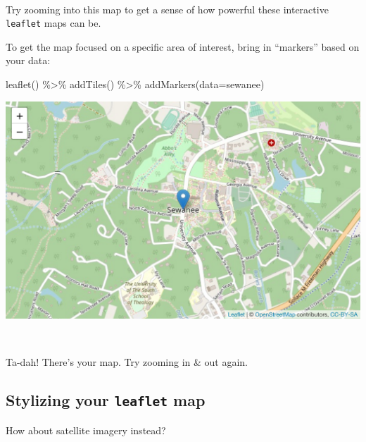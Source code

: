 \documentclass[
]{book}
\newenvironment{Shaded}{\begin{snugshade}}{\end{snugshade}}
\newcommand{\AttributeTok}[1]{\textcolor[rgb]{0.77,0.63,0.00}{#1}}
\newcommand{\FunctionTok}[1]{\textcolor[rgb]{0.00,0.00,0.00}{#1}}
\newcommand{\NormalTok}[1]{#1}
\newcommand{\SpecialCharTok}[1]{\textcolor[rgb]{0.00,0.00,0.00}{#1}}
\begin{document}
~

Try zooming into this map to get a sense of how powerful these interactive \texttt{leaflet} maps can be.

To get the map focused on a specific area of interest, bring in ``markers'' based on your data:

\begin{Shaded}
\begin{Highlighting}[]
\FunctionTok{leaflet}\NormalTok{() }\SpecialCharTok{\%\textgreater{}\%} 
    \FunctionTok{addTiles}\NormalTok{() }\SpecialCharTok{\%\textgreater{}\%} 
    \FunctionTok{addMarkers}\NormalTok{(}\AttributeTok{data=}\NormalTok{sewanee)}
\end{Highlighting}
\end{Shaded}

\includegraphics{figures/unnamed-chunk-214-1.pdf}

~

Ta-dah! There's your map. Try zooming in \& out again.

\hypertarget{stylizing-your-leaflet-map}{%
\subsection*{\texorpdfstring{Stylizing your \texttt{leaflet} map}{Stylizing your leaflet map}}\label{stylizing-your-leaflet-map}}

How about satellite imagery instead?

\begin{Shaded}
\end{Shaded}
\end{document}
